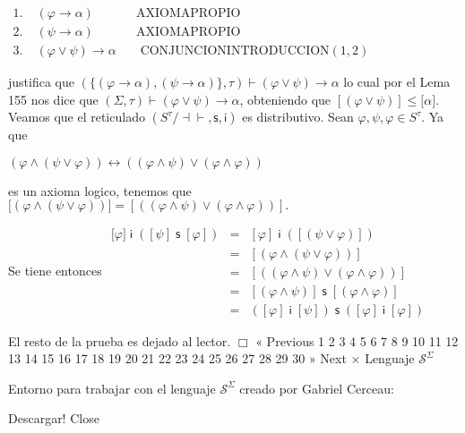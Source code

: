 \(\displaystyle \begin{array}{llll} 1.\; & (\varphi \rightarrow \alpha ) & & \text{AXIOMAPROPIO} \\ 2.\; & (\psi \rightarrow \alpha ) & & \text{AXIOMAPROPIO} \\ 3.\; & (\varphi \vee \psi )\rightarrow \alpha & & \text{ CONJUNCIONINTRODUCCION}(1,2) \end{array} \)

justifica que \((\{(\varphi \rightarrow \alpha ),(\psi \rightarrow \alpha )\},\tau )\vdash (\varphi \vee \psi )\rightarrow \alpha \) lo cual por el Lema 155 nos dice que \((\Sigma ,\tau )\vdash (\varphi \vee \psi )\rightarrow \alpha \), obteniendo que \([(\varphi \vee \psi )]\leq \lbrack \alpha ].\)
Veamos que el reticulado \((S^{\tau }/\mathrm{\dashv \vdash },\mathsf{s}, \mathsf{i})\) es distributivo. Sean \(\varphi ,\psi ,\varphi \in S^{\tau }.\) Ya que

\(\displaystyle (\varphi \wedge (\psi \vee \varphi ))\leftrightarrow ((\varphi \wedge \psi )\vee (\varphi \wedge \varphi )) \)

es un axioma logico, tenemos que
\(\displaystyle \lbrack (\varphi \wedge (\psi \vee \varphi ))]=[((\varphi \wedge \psi )\vee (\varphi \wedge \varphi ))]. \)

Se tiene entonces
\(\displaystyle \begin{array}{lll} \lbrack \varphi ]\;\mathsf{i}\;([\psi ]\;\mathsf{s}\;[\varphi ]) & = & [\varphi ]\;\mathsf{i}\;([(\psi \vee \varphi )]) \\ & = & [(\varphi \wedge (\psi \vee \varphi ))] \\ & = & [((\varphi \wedge \psi )\vee (\varphi \wedge \varphi ))] \\ & = & [(\varphi \wedge \psi )]\;\mathsf{s}\;[(\varphi \wedge \varphi )] \\ & = & ([\varphi ]\;\mathsf{i}\;[\psi ])\;\mathsf{s}\;([\varphi ]\;\mathsf{i} \;[\varphi ]) \end{array} \)

El resto de la prueba es dejado al lector. \(\Box\)
« Previous
1
2
3
4
5
6
7
8
9
10
11
12
13
14
15
16
17
18
19
20
21
22
23
24
25
26
27
28
29
30
» Next
×
Lenguaje \(\mathcal{S}^{\Sigma }\)

Entorno para trabajar con el lenguaje \(\mathcal{S}^{\Sigma }\) creado por Gabriel Cerceau:

Descargar!
Close
